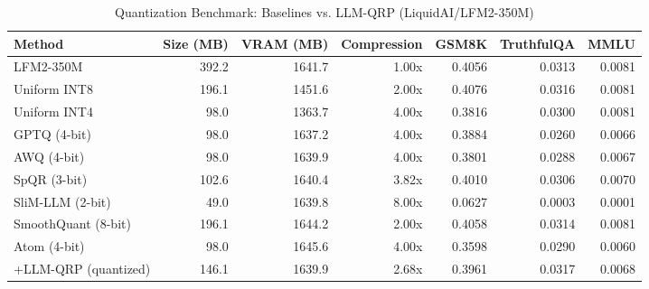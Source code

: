 \begin{table}[htbp]
  \centering
  \small
  \caption{Quantization Benchmark: Baselines vs. LLM-QRP (LiquidAI/LFM2-350M)}
  \label{tab:benchmark}
  \begin{tabular}{lrrrrrr}
    \toprule
    \textbf{Method} & \textbf{Size (MB)} & \textbf{VRAM (MB)} & \textbf{Compression} & \textbf{GSM8K} & \textbf{TruthfulQA} & \textbf{MMLU} \\
    \midrule
    LFM2-350M & 392.2 & 1641.7 & 1.00x & 0.4056 & 0.0313 & 0.0081 \\
    Uniform INT8 & 196.1 & 1451.6 & 2.00x & 0.4076 & 0.0316 & 0.0081 \\
    Uniform INT4 & 98.0 & 1363.7 & 4.00x & 0.3816 & 0.0300 & 0.0081 \\
    GPTQ (4-bit) & 98.0 & 1637.2 & 4.00x & 0.3884 & 0.0260 & 0.0066 \\
    AWQ (4-bit) & 98.0 & 1639.9 & 4.00x & 0.3801 & 0.0288 & 0.0067 \\
    SpQR (3-bit) & 102.6 & 1640.4 & 3.82x & 0.4010 & 0.0306 & 0.0070 \\
    SliM-LLM (2-bit) & 49.0 & 1639.8 & 8.00x & 0.0627 & 0.0003 & 0.0001 \\
    SmoothQuant (8-bit) & 196.1 & 1644.2 & 2.00x & 0.4058 & 0.0314 & 0.0081 \\
    Atom (4-bit) & 98.0 & 1645.6 & 4.00x & 0.3598 & 0.0290 & 0.0060 \\
    \midrule
    +LLM-QRP (quantized) & 146.1 & 1639.9 & 2.68x & 0.3961 & 0.0317 & 0.0068 \\
    \bottomrule
  \end{tabular}
\end{table}
